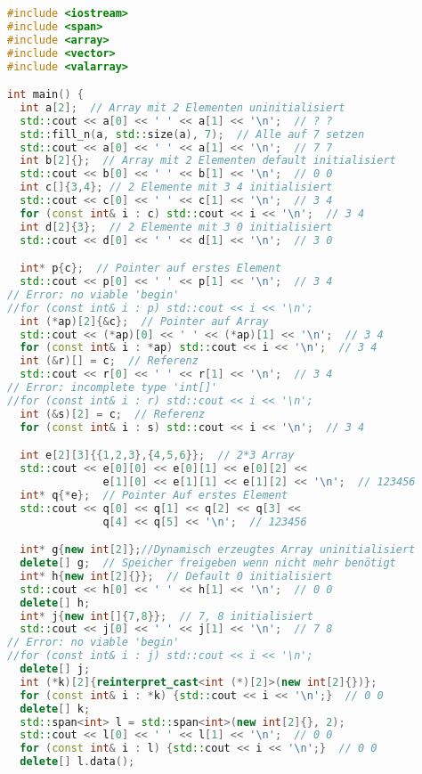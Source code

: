 \begin{lstlisting}[language=C++]
#include <iostream>
#include <span>
#include <array>
#include <vector>
#include <valarray>

int main() {
  int a[2];  // Array mit 2 Elementen uninitialisiert
  std::cout << a[0] << ' ' << a[1] << '\n';  // ? ?
  std::fill_n(a, std::size(a), 7);  // Alle auf 7 setzen
  std::cout << a[0] << ' ' << a[1] << '\n';  // 7 7
  int b[2]{};  // Array mit 2 Elementen default initialisiert
  std::cout << b[0] << ' ' << b[1] << '\n';  // 0 0
  int c[]{3,4}; // 2 Elemente mit 3 4 initialisiert
  std::cout << c[0] << ' ' << c[1] << '\n';  // 3 4
  for (const int& i : c) std::cout << i << '\n';  // 3 4
  int d[2]{3};  // 2 Elemente mit 3 0 initialisiert
  std::cout << d[0] << ' ' << d[1] << '\n';  // 3 0

  int* p{c};  // Pointer auf erstes Element
  std::cout << p[0] << ' ' << p[1] << '\n';  // 3 4
// Error: no viable 'begin'
//for (const int& i : p) std::cout << i << '\n';
  int (*ap)[2]{&c};  // Pointer auf Array
  std::cout << (*ap)[0] << ' ' << (*ap)[1] << '\n';  // 3 4
  for (const int& i : *ap) std::cout << i << '\n';  // 3 4
  int (&r)[] = c;  // Referenz
  std::cout << r[0] << ' ' << r[1] << '\n';  // 3 4
// Error: incomplete type 'int[]'
//for (const int& i : r) std::cout << i << '\n';
  int (&s)[2] = c;  // Referenz
  for (const int& i : s) std::cout << i << '\n';  // 3 4

  int e[2][3]{{1,2,3},{4,5,6}};  // 2*3 Array
  std::cout << e[0][0] << e[0][1] << e[0][2] <<
               e[1][0] << e[1][1] << e[1][2] << '\n';  // 123456
  int* q{*e};  // Pointer Auf erstes Element
  std::cout << q[0] << q[1] << q[2] << q[3] <<
               q[4] << q[5] << '\n';  // 123456

  int* g{new int[2]};//Dynamisch erzeugtes Array uninitialisiert
  delete[] g;  // Speicher freigeben wenn nicht mehr benötigt
  int* h{new int[2]{}};  // Default 0 initialisiert
  std::cout << h[0] << ' ' << h[1] << '\n';  // 0 0
  delete[] h;
  int* j{new int[]{7,8}};  // 7, 8 initialisiert
  std::cout << j[0] << ' ' << j[1] << '\n';  // 7 8
// Error: no viable 'begin'
//for (const int& i : j) std::cout << i << '\n';
  delete[] j;
  int (*k)[2]{reinterpret_cast<int (*)[2]>(new int[2]{})};
  for (const int& i : *k) {std::cout << i << '\n';}  // 0 0
  delete[] k;
  std::span<int> l = std::span<int>(new int[2]{}, 2);
  std::cout << l[0] << ' ' << l[1] << '\n';  // 0 0
  for (const int& i : l) {std::cout << i << '\n';}  // 0 0
  delete[] l.data();


\end{lstlisting}
